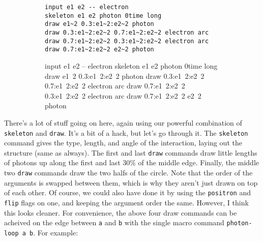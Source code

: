 \documentclass[12pt]{article}
\begin{document}
\begin{figure}[h!]\begin{subfigure}[h]{0.66\textwidth}\begin{center}
\begin{lstlisting}
input e1 e2 -- electron
skeleton e1 e2 photon 0time long
draw e1~2 0.3:e1~2:e2~2 photon
draw 0.3:e1~2:e2~2 0.7:e1~2:e2~2 electron arc
draw 0.7:e1~2:e2~2 0.3:e1~2:e2~2 electron arc
draw 0.7:e1~2:e2~2 e2~2 photon
\end{lstlisting}
\end{center}\end{subfigure}\hfill\vrule\hfill\begin{subfigure}[h]{0.2\textwidth}\begin{center}
\begin{feynr}
input e1 e2 -- electron
skeleton e1 e2 photon 0time long
draw e1~2 0.3:e1~2:e2~2 photon
draw 0.3:e1~2:e2~2 0.7:e1~2:e2~2 electron arc
draw 0.7:e1~2:e2~2 0.3:e1~2:e2~2 electron arc
draw 0.7:e1~2:e2~2 e2~2 photon
\end{feynr}
\end{center}\end{subfigure}\end{figure}
There's a lot of stuff going on here, again using our powerful combination of \texttt{skeleton} and \texttt{draw}.
It's a bit of a hack, but let's go through it.
The \texttt{skeleton} command gives the type, length, and angle of the interaction, laying out the structure (same as always).
The first and last \texttt{draw} commands draw little lengths of photons up along the first and last 30\% of the middle edge.
Finally, the middle two \texttt{draw} commands draw the two halfs of the circle.
Note that the order of the arguments is swapped between them, which is why they aren't just drawn on top of each other.
Of course, we could also have done it by using the \texttt{positron} and \texttt{flip} flags on one, and keeping the argument order the same.
However, I think this looks cleaner.
For convenience, the above four draw commands can be acheived on the edge between \texttt{a} and \texttt{b} with the single macro command \texttt{photon-loop a b}.
For example:
\end{document}

